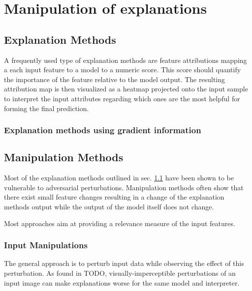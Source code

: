 \section{Manipulation of explanations}

\subsection{Explanation Methods}
\label{subsec:explanation_methods}
A frequently used type of explanation methods are feature attributions mapping a each input feature to a model to a numeric score. This score should quantify the importance of the feature relative to the model output. The resulting attribution map is then visualized as a heatmap projected onto the input sample to interpret the input attributes regarding which ones are the most helpful for forming the final prediction. 



\subsubsection{Explanation methods using gradient information}





\subsection{Manipulation Methods}
\label{subsec:manipulation_methods}
Most of the explanation methods outlined in sec. \ref{subsec:explanation_methods} have been shown to be vulnerable to adversarial perturbations. 
Manipulation methods often show that there exist small feature changes resulting in a change of the explanation methods output while the output of the model itself does not change. 




Most approaches aim at providing a relevance measure of the input features. 


\subsubsection{Input Manipulations}
\label{subsec:input_manipuls}

The general approach is to perturb input data while observing the effect of this perturbation. As found in TODO, visually-imperceptible perturbations of an input image can make explanations worse for the same model and interpreter. 




